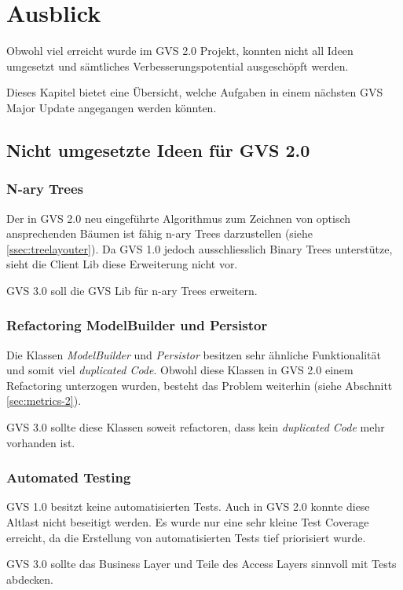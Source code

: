 \documentclass[11pt,a4paper,english,oneside]{book}
\numberwithin{equation}{chapter}
\begin{document}
	\section{Ausblick}
	Obwohl viel erreicht wurde im GVS 2.0 Projekt, konnten nicht all Ideen umgesetzt und sämtliches Verbesserungspotential ausgeschöpft werden.
	
	Dieses Kapitel bietet eine Übersicht, welche Aufgaben in einem nächsten GVS Major Update angegangen werden könnten. 
	
	
	\subsection{Nicht umgesetzte Ideen für GVS 2.0}

	\subsubsection{N-ary Trees}
	Der in GVS 2.0 neu eingeführte Algorithmus zum Zeichnen von optisch ansprechenden Bäumen ist fähig n-ary Trees darzustellen (siehe \ref{ssec:treelayouter}). Da GVS 1.0 jedoch ausschliesslich Binary Trees unterstütze, sieht die Client Lib diese Erweiterung nicht vor.
	
	GVS 3.0 soll die GVS Lib für n-ary Trees erweitern.
	
	\subsubsection{Refactoring ModelBuilder und Persistor}
	Die Klassen \textit{ModelBuilder} und \textit{Persistor} besitzen sehr ähnliche Funktionalität und somit viel \textit{duplicated Code}. Obwohl diese Klassen in GVS 2.0 einem Refactoring unterzogen wurden, besteht das Problem weiterhin (siehe Abschnitt \ref{sec:metrics-2}).
	
	GVS 3.0 sollte diese Klassen soweit refactoren, dass kein \textit{duplicated Code} mehr vorhanden ist.
	
	\subsubsection{Automated Testing}
	GVS 1.0 besitzt keine automatisierten Tests. Auch in GVS 2.0 konnte diese Altlast nicht beseitigt werden. Es wurde nur eine sehr kleine Test Coverage erreicht, da die Erstellung von automatisierten Tests tief priorisiert wurde.
	
	GVS 3.0 sollte das Business Layer und Teile des Access Layers sinnvoll mit Tests abdecken.
	
\end{document}
